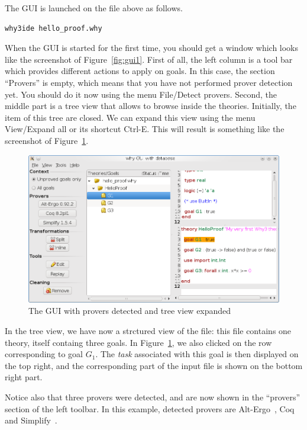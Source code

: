 The GUI is launched on the file above as follows.
\begin{verbatim}
why3ide hello_proof.why
\end{verbatim}
When the GUI is started for the first time, you should get a window
which looks like the screenshot of Figure~\ref{fig:gui1}. First of
all, the left column is a tool bar which provides different actions to
apply on goals. In this case, the section ``Provers'' is empty, which
means that you have not performed prover detection yet. You should do it
now using the menu \textsf{File/Detect provers}. Second, the middle
part is a tree view that allows to browse inside the
theories. Initially, the item of this tree are closed. We can
expand this view using the menu \textsf{View/Expand all} or its
shortcut \textsf{Ctrl-E}. This will result is something like the
screenshot of Figure~\ref{fig:gui2}.

\begin{figure}[tbp]
  \includegraphics[width=\textwidth]{gui2.png}
  \caption{The GUI with provers detected and tree view expanded}
  \label{fig:gui2}
\end{figure}

In the tree view, we have now a strctured view of the file: this file
contains one theory, itself containg three goals. In
Figure~\ref{fig:gui2}, we also clicked on the row corresponding to
goal $G_1$. The \emph{task} associated with this goal is then
displayed on the top right, and the corresponding part of the input
file is shown on the bottom right part.

Notice also that three provers were detected, and are now shown
in the ``provers'' section of the left toolbar. In this example,
detected provers are Alt-Ergo~\cite{ergo}, Coq~\cite{CoqArt} and
Simplify~\cite{simplify05}. 

